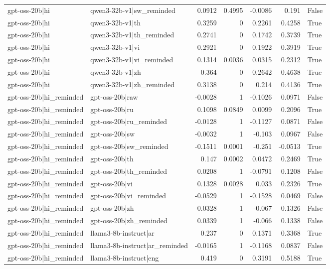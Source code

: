 \begin{table}
\begin{tabular}{l l r r r r l}
gpt-oss-20b|hi & qwen3-32b-v1|sw_reminded & 0.0912 & 0.4995 & -0.0086 & 0.191 & False \\
gpt-oss-20b|hi & qwen3-32b-v1|th & 0.3259 & 0 & 0.2261 & 0.4258 & True \\
gpt-oss-20b|hi & qwen3-32b-v1|th_reminded & 0.2741 & 0 & 0.1742 & 0.3739 & True \\
gpt-oss-20b|hi & qwen3-32b-v1|vi & 0.2921 & 0 & 0.1922 & 0.3919 & True \\
gpt-oss-20b|hi & qwen3-32b-v1|vi_reminded & 0.1314 & 0.0036 & 0.0315 & 0.2312 & True \\
gpt-oss-20b|hi & qwen3-32b-v1|zh & 0.364 & 0 & 0.2642 & 0.4638 & True \\
gpt-oss-20b|hi & qwen3-32b-v1|zh_reminded & 0.3138 & 0 & 0.214 & 0.4136 & True \\
gpt-oss-20b|hi_reminded & gpt-oss-20b|raw & -0.0028 & 1 & -0.1026 & 0.0971 & False \\
gpt-oss-20b|hi_reminded & gpt-oss-20b|ru & 0.1098 & 0.0849 & 0.0099 & 0.2096 & True \\
gpt-oss-20b|hi_reminded & gpt-oss-20b|ru_reminded & -0.0128 & 1 & -0.1127 & 0.0871 & False \\
gpt-oss-20b|hi_reminded & gpt-oss-20b|sw & -0.0032 & 1 & -0.103 & 0.0967 & False \\
gpt-oss-20b|hi_reminded & gpt-oss-20b|sw_reminded & -0.1511 & 0.0001 & -0.251 & -0.0513 & True \\
gpt-oss-20b|hi_reminded & gpt-oss-20b|th & 0.147 & 0.0002 & 0.0472 & 0.2469 & True \\
gpt-oss-20b|hi_reminded & gpt-oss-20b|th_reminded & 0.0208 & 1 & -0.0791 & 0.1208 & False \\
gpt-oss-20b|hi_reminded & gpt-oss-20b|vi & 0.1328 & 0.0028 & 0.033 & 0.2326 & True \\
gpt-oss-20b|hi_reminded & gpt-oss-20b|vi_reminded & -0.0529 & 1 & -0.1528 & 0.0469 & False \\
gpt-oss-20b|hi_reminded & gpt-oss-20b|zh & 0.0328 & 1 & -0.067 & 0.1326 & False \\
gpt-oss-20b|hi_reminded & gpt-oss-20b|zh_reminded & 0.0339 & 1 & -0.066 & 0.1338 & False \\
gpt-oss-20b|hi_reminded & llama3-8b-instruct|ar & 0.237 & 0 & 0.1371 & 0.3368 & True \\
gpt-oss-20b|hi_reminded & llama3-8b-instruct|ar_reminded & -0.0165 & 1 & -0.1168 & 0.0837 & False \\
gpt-oss-20b|hi_reminded & llama3-8b-instruct|eng & 0.419 & 0 & 0.3191 & 0.5188 & True \\

\end{tabular}
\end{table}

